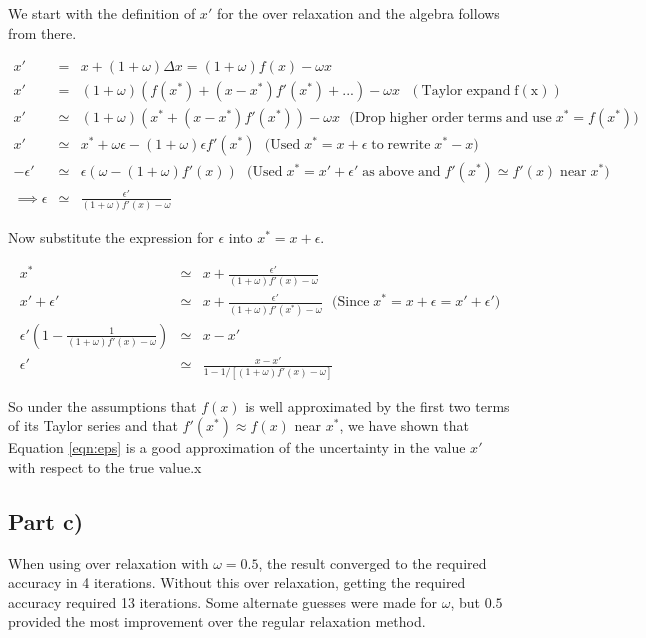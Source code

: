 \documentclass[a4paper,12pt]{article}
\begin{document}
We start with the definition of $x'$ for the over relaxation and the algebra follows from there.

\begin{eqnarray}
x' &=& x + (1+\omega)\Delta x = (1+\omega)f(x) - \omega x\nonumber\\
x' &=& (1+\omega)(f(x^*) + (x-x^*)f'(x^*) + ...) - \omega x \mathrm{\:\:\:(Taylor\;expand\;f(x))}\nonumber\\
x' &\simeq & (1+\omega)(x^* + (x-x^*)f'(x^*)) - \omega x \mathrm{\:\:\:(Drop\; higher\;order\;terms\;and\;use\;}x^* = f(x^*)\mathrm{)}\nonumber\\
x' &\simeq & x^* + \omega \epsilon - (1+\omega)\epsilon f'(x^*) \mathrm{\:\:\:(Used\;} x^* = x + \epsilon\mathrm{\;to\; rewrite\;} x^*-x)\nonumber\\
-\epsilon' &\simeq& \epsilon (\omega - (1+\omega)f'(x))\mathrm{\:\:\:(Used\;} x^* = x' + \epsilon' \mathrm{\; as\; above\; and\;} f'(x^*)\simeq f'(x)\mathrm{\; near\;} x^*)\nonumber\\
\implies \epsilon &\simeq& \frac{\epsilon'}{(1+\omega)f'(x) - \omega}\nonumber
\end{eqnarray}

Now substitute the expression for $\epsilon$ into $x^* = x + \epsilon$.

\begin{eqnarray}
x^* &\simeq& x + \frac{\epsilon'}{(1+\omega)f'(x) - \omega}\nonumber\\
x' + \epsilon' &\simeq& x + \frac{\epsilon'}{(1+\omega)f'(x^*)-\omega} \mathrm{\:\:\:(Since\;} x^* = x + \epsilon = x' + \epsilon')\nonumber\\
\epsilon'\left(1 - \frac{1}{(1+\omega)f'(x) - \omega}\right) &\simeq& x - x'\nonumber\\
\epsilon' &\simeq& \frac{x-x'}{1-1/[(1+\omega)f'(x) - \omega]}\nonumber 
\end{eqnarray}

So under the assumptions that $f(x)$ is well approximated by the first two terms of its Taylor series and that $f'(x^*)\approx f(x)$ near $x^*$, we have shown that Equation \ref{eqn:eps} is a good approximation of the uncertainty in the value $x'$ with respect to the true value.x

\subsection{Part c)}

When using over relaxation with $\omega = 0.5$, the result converged to the required accuracy in 4 iterations. Without this over relaxation, getting the required accuracy required 13 iterations. Some alternate guesses were made for $\omega$, but $0.5$ provided the most improvement over the regular relaxation method.
\end{document}
